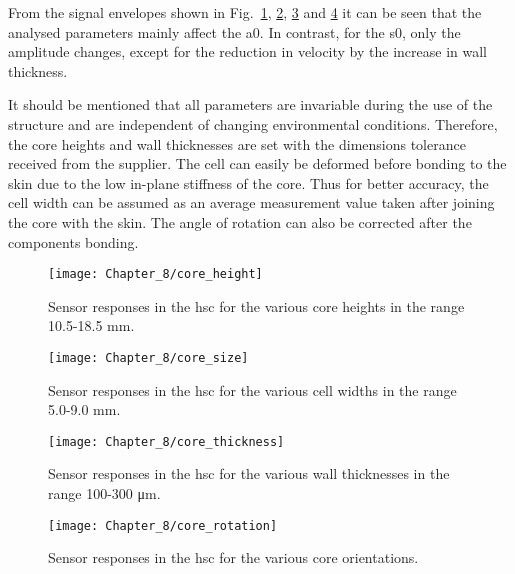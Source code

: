 From the signal envelopes shown in Fig.~\ref{fig:core_height}, \ref{fig:core_size}, \ref{fig:core_thickness} and \ref{fig:core_rotation} it can be seen that the analysed parameters mainly affect the \ac{a0}. 
In contrast, for the \ac{s0}, only the amplitude changes, except for the reduction in velocity by the increase in wall thickness.

It should be mentioned that all parameters are invariable during the use of the structure and are independent of changing environmental conditions.
Therefore, the core heights and wall thicknesses are set with the dimensions tolerance received from the supplier.
The cell can easily be deformed before bonding to the skin due to the low in-plane stiffness of the core.
Thus for better accuracy, the cell width can be assumed as an average measurement value taken after joining the core with the skin.
The angle of rotation can also be corrected after the components bonding.
\begin{figure}
	\begin{center}
		\texttt{[image: Chapter\_8/core\_height]}
	\end{center}
	\caption{Sensor responses in the \acf{hsc} for the various core heights in the range 10.5-18.5 \unit{\mm}.}
	\label{fig:core_height}
\end{figure}

\begin{figure}
	\begin{center}
		\texttt{[image: Chapter\_8/core\_size]}
	\end{center}
	\caption{Sensor responses in the \acf{hsc} for the various cell widths in the range 5.0-9.0 \unit{\mm}.}
	\label{fig:core_size}
\end{figure}

\begin{figure}
	\begin{center}
		\texttt{[image: Chapter\_8/core\_thickness]}
	\end{center}
	\caption{Sensor responses in the \acf{hsc} for the various wall thicknesses in the range 100-300 \unit{\micro\m}.}
	\label{fig:core_thickness}
\end{figure}

\begin{figure}
	\begin{center}
		\texttt{[image: Chapter\_8/core\_rotation]}
	\end{center}
	\caption{Sensor responses in the \acf{hsc} for the various core orientations.}
	\label{fig:core_rotation}
\end{figure}

